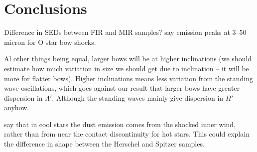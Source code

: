 
\section{Conclusions}
\label{sec:conclusion}

Difference in SEDs between FIR and MIR samples?  \citet{Meyer:2016a}
say emission peaks at 3--50 micron for O star bow shocks.

Al other things being equal, larger bows will be at higher
inclinations (we should estimate how much variation in size we should
get due to inclination -- it will be more for flatter bows).  Higher
inclinations means less variation from the standing wave oscillations,
which goes against our result that larger bows have greater dispersion
in \(\Lambda'\).  Although the standing waves mainly give dispersion in
\(\Pi'\) anyhow.

\citet{Meyer:2014a} say that in cool stars the dust emission comes
from the shocked inner wind, rather than from near the contact
discontinuity for hot stars.  This could explain the difference in
shape between the Herschel and Spitzer samples.

